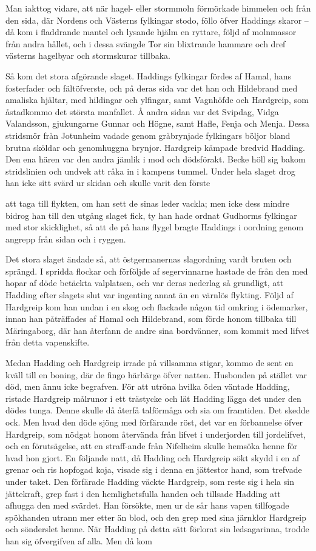 Man iakttog vidare, att när hagel- eller stormmoln förmörkade himmelen
och från den sida, där Nordens och Västerns fylkingar stodo, föllo öfver
Haddings skaror -- då kom i fladdrande mantel och lysande hjälm en
ryttare, följd af molnmassor från andra hållet, och i dessa svängde Tor
sin blixtrande hammare och dref västerns hagelbyar och stormskurar
tillbaka.

Så kom det stora afgörande slaget. Haddings fylkingar fördes af Hamal,
hans fosterfader och fältöfverste, och på deras sida var det han och
Hildebrand med amaliska hjältar, med hildingar och ylfingar, samt
Vagnhöfde och Hardgreip, som åstadkommo det största manfallet. Å andra
sidan var det Svipdag, Vidga Valandsson, gjukungarne Gunnar och Högne,
samt Hafle, Fenja och Menja. Dessa stridsmör från Jotunheim vadade genom
gråbrynjade fylkingars böljor bland brutna sköldar och genomhuggna
brynjor. Hardgreip kämpade bredvid Hadding. Den ena hären var den andra
jämlik i mod och dödsförakt. Becke höll sig bakom stridslinien och
undvek att råka in i kampens tummel. Under hela slaget drog han icke
sitt svärd ur skidan och skulle varit den förste

att taga till flykten, om han sett de sinas leder vackla; men icke dess
mindre bidrog han till den utgång slaget fick, ty han hade ordnat
Gudhorms fylkingar med stor skicklighet, så att de på hans flygel bragte
Haddings i oordning genom angrepp från sidan och i ryggen.

Det stora slaget ändade så, att östgermanernas slagordning vardt bruten
och sprängd. I spridda flockar och förföljde af segervinnarne hastade de
från den med hopar af döde betäckta valplatsen, och var deras nederlag
så grundligt, att Hadding efter slagets slut var ingenting annat än en
värnlös flykting. Följd af Hardgreip kom han undan i en skog och
flackade någon tid omkring i ödemarker, innan han påträffades af Hamal
och Hildebrand, som förde honom tillbaka till Märingaborg, där han
återfann de andre sina bordvänner, som kommit med lifvet från detta
vapenskifte.

Medan Hadding och Hardgreip irrade på villsamma stigar, kommo de sent en
kväll till en boning, där de fingo härbärge öfver natten. Husbonden på
stället var död, men ännu icke begrafven. För att utröna hvilka öden
väntade Hadding, ristade Hardgreip målrunor i ett trästycke och lät
Hadding lägga det under den dödes tunga. Denne skulle då återfå
talförmåga och sia om framtiden. Det skedde ock. Men hvad den döde sjöng
med förfärande röst, det var en förbannelse öfver Hardgreip, som nödgat
honom återvända från lifvet i underjorden till jordelifvet, och en
förutsägelse, att en straff-ande från Nifelheim skulle hemsöka henne för
hvad hon gjort. En följande natt, då Hadding och Hardgreip sökt skydd i
en af grenar och ris hopfogad koja, visade sig i denna en jättestor
hand, som trefvade under taket. Den förfärade Hadding väckte Hardgreip,
som reste sig i hela sin jättekraft, grep fast i den hemlighetsfulla
handen och tillsade Hadding att afhugga den med svärdet. Han försökte,
men ur de sår hans vapen tillfogade spökhanden utrann mer etter än blod,
och den grep med sina järnklor Hardgreip och sönderslet henne. När
Hadding på detta sätt förlorat sin ledsagarinna, trodde han sig
öfvergifven af alla. Men då kom

